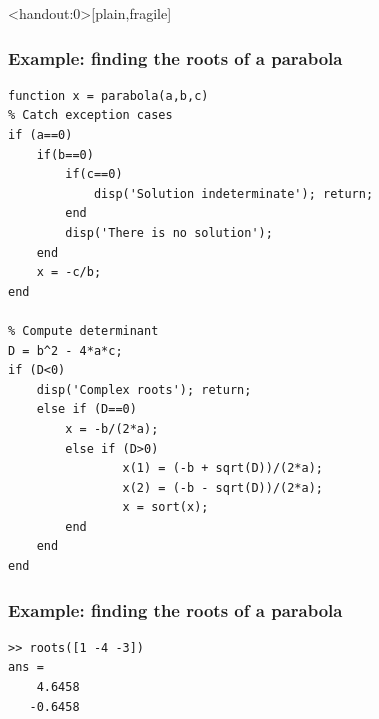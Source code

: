 \begin{frame}<handout:0>[plain,fragile]
  \frametitle{Example: finding the roots of a parabola}
  \small\selectfont
  \begin{lstlisting}[basicstyle=\scriptsize\ttfamily]
function x = parabola(a,b,c)
% Catch exception cases
if (a==0)
    if(b==0)
        if(c==0)
            disp('Solution indeterminate'); return;
        end
        disp('There is no solution');
    end
    x = -c/b;
end

% Compute determinant
D = b^2 - 4*a*c;
if (D<0)
    disp('Complex roots'); return;
    else if (D==0)
        x = -b/(2*a);
        else if (D>0)
                x(1) = (-b + sqrt(D))/(2*a);
                x(2) = (-b - sqrt(D))/(2*a);
                x = sort(x);
        end
    end
end
  \end{lstlisting}
\end{frame}

\begin{frame}[fragile]
  \frametitle{Example: finding the roots of a parabola}
  \begin{lstlisting}
>> roots([1 -4 -3])
ans =
    4.6458
   -0.6458
  \end{lstlisting}
\end{frame}



